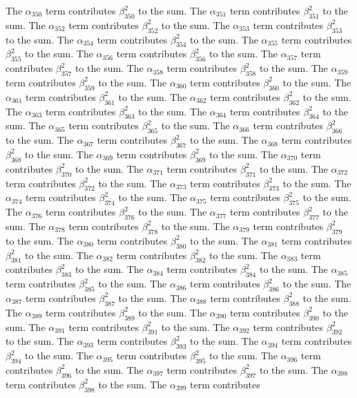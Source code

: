 \begin{lemma}
The $\alpha_{350}$ term contributes $\beta_{350}^{2}$ to the sum. The $\alpha_{351}$ term contributes $\beta_{351}^{2}$ to the sum. The $\alpha_{352}$ term contributes $\beta_{352}^{2}$ to the sum. The $\alpha_{353}$ term contributes $\beta_{353}^{2}$ to the sum. The $\alpha_{354}$ term contributes $\beta_{354}^{2}$ to the sum. The $\alpha_{355}$ term contributes $\beta_{355}^{2}$ to the sum. The $\alpha_{356}$ term contributes $\beta_{356}^{2}$ to the sum. The $\alpha_{357}$ term contributes $\beta_{357}^{2}$ to the sum. The $\alpha_{358}$ term contributes $\beta_{358}^{2}$ to the sum. The $\alpha_{359}$ term contributes $\beta_{359}^{2}$ to the sum. The $\alpha_{360}$ term contributes $\beta_{360}^{2}$ to the sum. The $\alpha_{361}$ term contributes $\beta_{361}^{2}$ to the sum. The $\alpha_{362}$ term contributes $\beta_{362}^{2}$ to the sum. The $\alpha_{363}$ term contributes $\beta_{363}^{2}$ to the sum. The $\alpha_{364}$ term contributes $\beta_{364}^{2}$ to the sum. The $\alpha_{365}$ term contributes $\beta_{365}^{2}$ to the sum. The $\alpha_{366}$ term contributes $\beta_{366}^{2}$ to the sum. The $\alpha_{367}$ term contributes $\beta_{367}^{2}$ to the sum. The $\alpha_{368}$ term contributes $\beta_{368}^{2}$ to the sum. The $\alpha_{369}$ term contributes $\beta_{369}^{2}$ to the sum. The $\alpha_{370}$ term contributes $\beta_{370}^{2}$ to the sum. The $\alpha_{371}$ term contributes $\beta_{371}^{2}$ to the sum. The $\alpha_{372}$ term contributes $\beta_{372}^{2}$ to the sum. The $\alpha_{373}$ term contributes $\beta_{373}^{2}$ to the sum. The $\alpha_{374}$ term contributes $\beta_{374}^{2}$ to the sum. The $\alpha_{375}$ term contributes $\beta_{375}^{2}$ to the sum. The $\alpha_{376}$ term contributes $\beta_{376}^{2}$ to the sum. The $\alpha_{377}$ term contributes $\beta_{377}^{2}$ to the sum. The $\alpha_{378}$ term contributes $\beta_{378}^{2}$ to the sum. The $\alpha_{379}$ term contributes $\beta_{379}^{2}$ to the sum. The $\alpha_{380}$ term contributes $\beta_{380}^{2}$ to the sum. The $\alpha_{381}$ term contributes $\beta_{381}^{2}$ to the sum. The $\alpha_{382}$ term contributes $\beta_{382}^{2}$ to the sum. The $\alpha_{383}$ term contributes $\beta_{383}^{2}$ to the sum. The $\alpha_{384}$ term contributes $\beta_{384}^{2}$ to the sum. The $\alpha_{385}$ term contributes $\beta_{385}^{2}$ to the sum. The $\alpha_{386}$ term contributes $\beta_{386}^{2}$ to the sum. The $\alpha_{387}$ term contributes $\beta_{387}^{2}$ to the sum. The $\alpha_{388}$ term contributes $\beta_{388}^{2}$ to the sum. The $\alpha_{389}$ term contributes $\beta_{389}^{2}$ to the sum. The $\alpha_{390}$ term contributes $\beta_{390}^{2}$ to the sum. The $\alpha_{391}$ term contributes $\beta_{391}^{2}$ to the sum. The $\alpha_{392}$ term contributes $\beta_{392}^{2}$ to the sum. The $\alpha_{393}$ term contributes $\beta_{393}^{2}$ to the sum. The $\alpha_{394}$ term contributes $\beta_{394}^{2}$ to the sum. The $\alpha_{395}$ term contributes $\beta_{395}^{2}$ to the sum. The $\alpha_{396}$ term contributes $\beta_{396}^{2}$ to the sum. The $\alpha_{397}$ term contributes $\beta_{397}^{2}$ to the sum. The $\alpha_{398}$ term contributes $\beta_{398}^{2}$ to the sum. The $\alpha_{399}$ term contributes 
\end{lemma}
